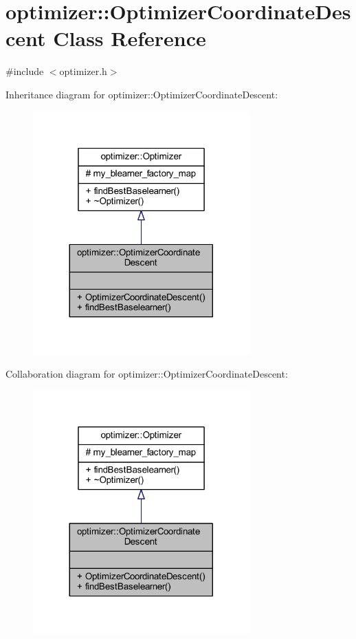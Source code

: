 \hypertarget{classoptimizer_1_1_optimizer_coordinate_descent}{}\section{optimizer\+:\+:Optimizer\+Coordinate\+Descent Class Reference}
\label{classoptimizer_1_1_optimizer_coordinate_descent}


{\ttfamily \#include $<$optimizer.\+h$>$}



Inheritance diagram for optimizer\+:\+:Optimizer\+Coordinate\+Descent\+:
\nopagebreak
\begin{figure}[H]
\begin{center}
\leavevmode
\includegraphics[width=236pt]{classoptimizer_1_1_optimizer_coordinate_descent__inherit__graph}
\end{center}
\end{figure}


Collaboration diagram for optimizer\+:\+:Optimizer\+Coordinate\+Descent\+:
\nopagebreak
\begin{figure}[H]
\begin{center}
\leavevmode
\includegraphics[width=236pt]{classoptimizer_1_1_optimizer_coordinate_descent__coll__graph}
\end{center}
\end{figure}
